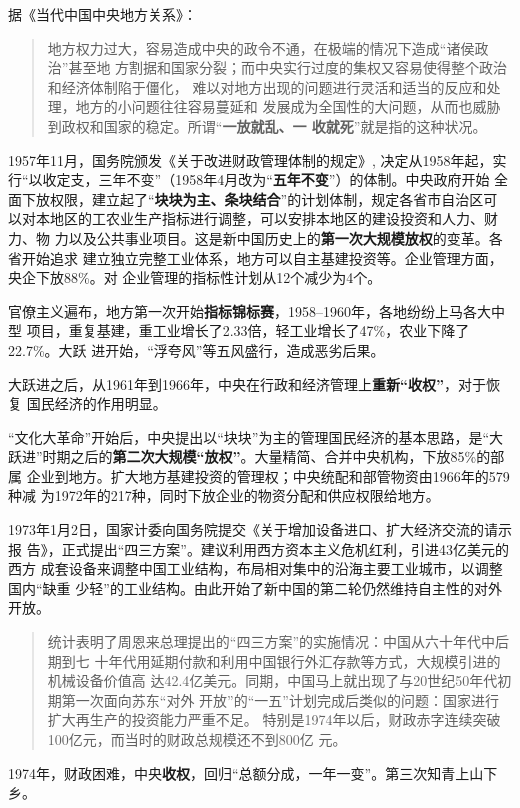 据《当代中国中央地方关系》：
\begin{quotation}
  地方权力过大，容易造成中央的政令不通，在极端的情况下造成“诸侯政治”甚至地
  方割据和国家分裂；而中央实行过度的集权又容易使得整个政治和经济体制陷于僵化，
  难以对地方出现的问题进行灵活和适当的反应和处理，地方的小问题往往容易蔓延和
  发展成为全国性的大问题，从而也威胁到政权和国家的稳定。所谓“\textbf{一放就乱、一
    收就死}”就是指的这种状况。
\end{quotation}

1957年11月，国务院颁发《关于改进财政管理体制的规定》, 决定从1958年起，实
行“以收定支，三年不变”（1958年4月改为“\textbf{五年不变}”）的体制。中央政府开始
全面下放权限，建立起了“\textbf{块块为主、条块结合}”的计划体制，规定各省市自治区可
以对本地区的工农业生产指标进行调整，可以安排本地区的建设投资和人力、财力、物
力以及公共事业项目。这是新中国历史上的\textbf{第一次大规模放权}的变革。各省开始追求
建立独立完整工业体系，地方可以自主基建投资等。企业管理方面，央企下放88\%。对
企业管理的指标性计划从12个减少为4个。

官僚主义遍布，地方第一次开始\textbf{指标锦标赛}，1958--1960年，各地纷纷上马各大中型
项目，重复基建，重工业增长了2.33倍，轻工业增长了47\%，农业下降了22.7\%。大跃
进开始，“浮夸风”等五风盛行，造成恶劣后果。

大跃进之后，从1961年到1966年，中央在行政和经济管理上\textbf{重新“收权”}，对于恢复
国民经济的作用明显。

“文化大革命”开始后，中央提出以“块块”为主的管理国民经济的基本思路，是“大
跃进”时期之后的\textbf{第二次大规模“放权”}。大量精简、合并中央机构，下放85\%的部属
企业到地方。扩大地方基建投资的管理权；中央统配和部管物资由1966年的579种减
为1972年的217种，同时下放企业的物资分配和供应权限给地方。

1973年1月2日，国家计委向国务院提交《关于增加设备进口、扩大经济交流的请示报
告》，正式提出“四三方案”。建议利用西方资本主义危机红利，引进43亿美元的西方
成套设备来调整中国工业结构，布局相对集中的沿海主要工业城市，以调整国内“缺重
少轻”的工业结构。由此开始了新中国的第二轮仍然维持自主性的对外开放。
\begin{quotation}
  统计表明了周恩来总理提出的“四三方案”的实施情况：中国从六十年代中后期到七
  十年代用延期付款和利用中国银行外汇存款等方式，大规模引进的机械设备价值高
  达42.4亿美元。同期，中国马上就出现了与20世纪50年代初期第一次面向苏东“对外
  开放”的“一五”计划完成后类似的问题：国家进行扩大再生产的投资能力严重不足。
  特别是1974年以后，财政赤字连续突破100亿元，而当时的财政总规模还不到800亿
  元。\cite{wenbaci}
\end{quotation}
1974年，财政困难，中央\textbf{收权}，回归“总额分成，一年一变”。第三次知青上山下乡。

